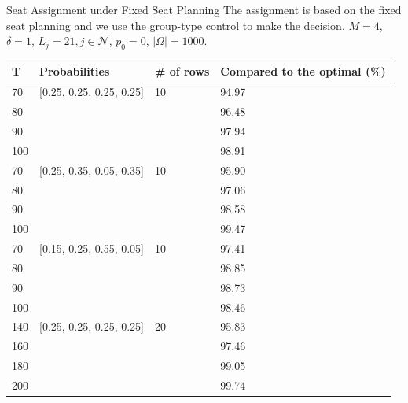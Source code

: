     \begin{frame}{Seat Assignment under Fixed Seat Planning}
      \scriptsize
      The assignment is based on the fixed seat planning and we use the group-type control to make the decision. 
      $M =4$, $\delta =1$, $L_j =21, j \in \mathcal{N}$, $p_0 = 0$, $|\Omega| = 1000$.
      \begin{table}[ht]
        \centering
        \begin{tabular}{|l|l|l|l|}
        \hline
         T & Probabilities & \# of rows & Compared to the optimal (\%)  \\
        \hline
        70  & [0.25, 0.25, 0.25, 0.25]  & 10 & 94.97  \\
        80  &   &  & 96.48   \\
        90  &   &  & 97.94   \\
        100  &   &  & 98.91   \\
        \hline
        70  & [0.25, 0.35, 0.05, 0.35]  & 10 & 95.90 \\
        80  &   &  & 97.06  \\
        90  &   &  & 98.58  \\
        100  &   &  & 99.47 \\
        \hline
        70  & [0.15, 0.25, 0.55, 0.05]  & 10 & 97.41  \\
        80  &   &  & 98.85  \\
        90  &   &  & 98.73  \\
        100  &   &  & 98.46  \\
        \hline
        140  & [0.25, 0.25, 0.25, 0.25]  & 20 & 95.83  \\
        160  &   &  & 97.46  \\
        180  &   &  & 99.05  \\
        200  &   &  & 99.74  \\
        \hline
        \end{tabular}
      \end{table}
  
    \end{frame}



